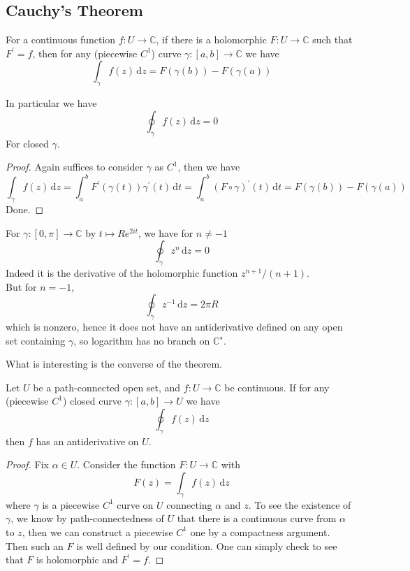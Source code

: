 \subsection{Cauchy's Theorem}
\begin{theorem}
    For a continuous function $f:U\to\mathbb C$, if there is a holomorphic $F:U\to\mathbb C$ such that $F^\prime=f$, then for any (piecewise $C^1$) curve $\gamma:[a,b]\to\mathbb C$ we have
    $$\int_\gamma f(z)\,\mathrm dz=F(\gamma(b))-F(\gamma(a))$$
\end{theorem}
In particular we have
$$\oint_\gamma f(z)\,\mathrm dz=0$$
For closed $\gamma$.
\begin{proof}
    Again suffices to consider $\gamma$ as $C^1$, then we have
    $$\int_\gamma f(z)\,\mathrm dz=\int_a^bF^\prime(\gamma(t))\gamma^\prime(t)\,\mathrm dt=\int_a^b(F\circ\gamma)^\prime(t)\,\mathrm dt=F(\gamma(b))-F(\gamma(a))$$
    Done.
\end{proof}
\begin{example}
    For $\gamma:[0,\pi]\to\mathbb C$ by $t\mapsto Re^{2it}$, we have for $n\neq -1$
    $$\oint_\gamma z^n\,\mathrm dz=0$$
    Indeed it is the derivative of the holomorphic function $z^{n+1}/(n+1)$.\\
    But for $n=-1$,
    $$\oint_\gamma z^{-1}\,\mathrm dz=2\pi R$$
    which is nonzero, hence it does not have an antiderivative defined on any open set containing $\gamma$, so logarithm has no branch on $\mathbb C^\star$.
\end{example}
What is interesting is the converse of the theorem.
\begin{theorem}
    Let $U$ be a path-connected open set, and $f:U\to\mathbb C$ be continuous.
    If for any (piecewise $C^1$) closed curve $\gamma:[a,b]\to U$ we have
    $$\oint_\gamma f(z)\,\mathrm dz$$
    then $f$ has an antiderivative on $U$.
\end{theorem}
\begin{proof}
    Fix $\alpha\in U$.
    Consider the function $F:U\to\mathbb C$ with
    $$F(z)=\int_\gamma f(z)\,\mathrm dz$$
    where $\gamma$ is a piecewise $C^1$ curve on $U$ connecting $\alpha$ and $z$.
    To see the existence of $\gamma$, we know by path-connectedness of $U$ that there is a continuous curve from $\alpha$ to $z$, then we can construct a piecewise $C^1$ one by a compactness argument.\\
    Then such an $F$ is well defined by our condition.
    One can simply check to see that $F$ is holomorphic and $F^\prime=f$.
\end{proof}
